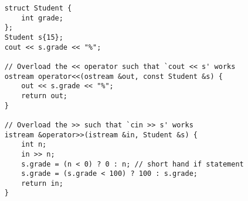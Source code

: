 \begin{lstlisting}
    struct Student {
        int grade;
    };
    Student s{15};
    cout << s.grade << "%";
    
    // Overload the << operator such that `cout << s' works
    ostream operator<<(ostream &out, const Student &s) {
        out << s.grade << "%";
        return out;
    }

    // Overload the >> such that `cin >> s' works
    istream &operator>>(istream &in, Student &s) {
        int n;
        in >> n;
        s.grade = (n < 0) ? 0 : n; // short hand if statement
        s.grade = (s.grade < 100) ? 100 : s.grade;
        return in;
    }
\end{lstlisting}
